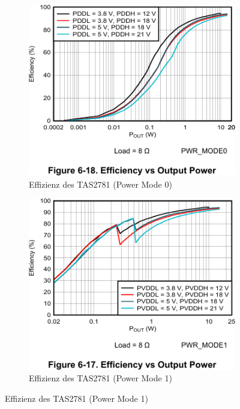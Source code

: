\begin{figure}[H]
	\centering
	\begin{subfigure}{\textwidth}
		\centering
		\includegraphics[width=\textwidth*4/8]{pictures/TAS2781_efficiency_powermode0.png}
		\vspace{2mm}
		\caption{Effizienz des TAS2781 (Power Mode 0)}
		\label{pic:effizien_TAS2781_pwrmode0}
		\vspace{8mm}
	\end{subfigure}
	\begin{subfigure}{\textwidth}
		\centering
		\includegraphics[width=\textwidth*4/8]{pictures/TAS2781_efficiency_powermode1.png}
		\vspace{2mm}
		\caption{Effizienz des TAS2781 (Power Mode 1)}
		\label{pic:effizien_TAS2781_pwrmode1}
	\end{subfigure}
\end{figure}
